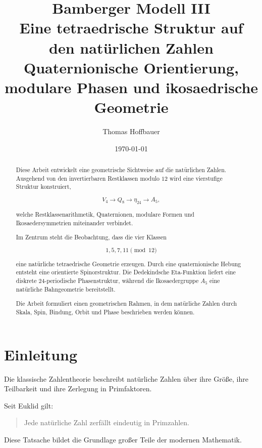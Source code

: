 \documentclass[11pt,a4paper]{article}
\title{
	Bamberger Modell III\\
	Eine tetraedrische Struktur auf den natürlichen Zahlen\\
	Quaternionische Orientierung, modulare Phasen und ikosaedrische Geometrie
}
\author{
	Thomas Hoffbauer
}
\date{\today}
\theoremstyle{definition}
\theoremstyle{remark}
\begin{document}
	
	\maketitle
	
	\begin{abstract}
		
		Diese Arbeit entwickelt eine geometrische Sichtweise auf die natürlichen Zahlen.
		Ausgehend von den invertierbaren Restklassen modulo \(12\) wird eine vierstufige
		Struktur konstruiert,
		
		\[
		V_4
		\rightarrow
		Q_8
		\rightarrow
		\eta_{24}
		\rightarrow
		A_5,
		\]
		
		welche Restklassenarithmetik, Quaternionen,
		modulare Formen und Ikosaedersymmetrien miteinander verbindet.
		
		Im Zentrum steht die Beobachtung, dass die vier Klassen
		
		\[
		1,5,7,11 \pmod{12}
		\]
		
		eine natürliche tetraedrische Geometrie erzeugen.
		Durch eine quaternionische Hebung entsteht eine orientierte Spinorstruktur.
		Die Dedekindsche Eta-Funktion liefert eine diskrete
		24-periodische Phasenstruktur,
		während die Ikosaedergruppe \(A_5\)
		eine natürliche Bahngeometrie bereitstellt.
		
		Die Arbeit formuliert einen geometrischen Rahmen,
		in dem natürliche Zahlen durch Skala,
		Spin,
		Bindung,
		Orbit
		und Phase beschrieben werden können.
		
	\end{abstract}
	
	\tableofcontents
	
	\newpage
	
	
	\section{Einleitung}
	
	Die klassische Zahlentheorie beschreibt natürliche Zahlen
	über ihre Größe,
	ihre Teilbarkeit
	und ihre Zerlegung in Primfaktoren.
	
	Seit Euklid gilt:
	
	\begin{quote}
		Jede natürliche Zahl zerfällt eindeutig in Primzahlen.
	\end{quote}
	
	Diese Tatsache bildet die Grundlage großer Teile der modernen Mathematik.
	
\end{document}
